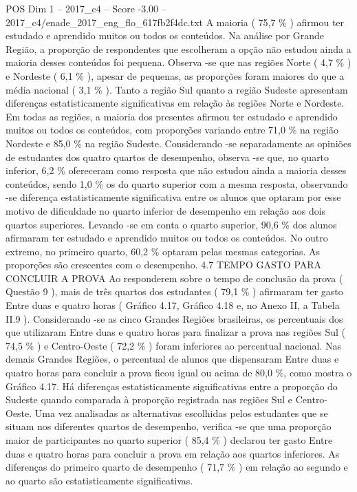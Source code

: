 \begin{textsample}{POS Dim 1 – 2017\_c4 – Score -3.00 – 2017\_c4/enade\_2017\_eng\_flo\_617fb2f4dc.txt}
A maioria ( 75,7 \% ) afirmou ter estudado e aprendido muitos ou todos os conteúdos.
Na análise por Grande Região, a proporção de respondentes que escolheram a opção não estudou ainda a maioria desses conteúdos foi pequena.
Observa -se que nas regiões Norte ( 4,7 \% ) e Nordeste ( 6,1 \% ), apesar de pequenas, as proporções foram maiores do que a média nacional ( 3,1 \% ).
Tanto a região Sul quanto a região Sudeste apresentam diferenças estatisticamente significativas em relação às regiões Norte e Nordeste.
Em todas as regiões, a maioria dos presentes afirmou ter estudado e aprendido muitos ou todos os conteúdos, com proporções variando entre 71,0 \% na região Nordeste e 85,0 \% na região Sudeste.
Considerando -se separadamente as opiniões de estudantes dos quatro quartos de desempenho, observa -se que, no quarto inferior, 6,2 \% ofereceram como resposta que não estudou ainda a maioria desses conteúdos, sendo 1,0 \% os do quarto superior com a mesma resposta, observando -se diferença estatisticamente significativa entre os alunos que optaram por esse motivo de dificuldade no quarto inferior de desempenho em relação aos dois quartos superiores.
Levando -se em conta o quarto superior, 90,6 \% dos alunos afirmaram ter estudado e aprendido muitos ou todos os conteúdos.
No outro extremo, no primeiro quarto, 60,2 \% optaram pelas mesmas categorias.
As proporções são crescentes com o desempenho. 4.7 TEMPO GASTO PARA CONCLUIR A PROVA Ao responderem sobre o tempo de conclusão da prova ( Questão 9 ), mais de três quartos dos estudantes ( 79,1 \% ) afirmaram ter gasto Entre duas e quatro horas ( Gráfico 4.17, Gráfico 4.18 e, no Anexo II, a Tabela II.9 ).
Considerando -se as cinco Grandes Regiões brasileiras, os percentuais dos que utilizaram Entre duas e quatro horas para finalizar a prova nas regiões Sul ( 74,5 \% ) e Centro-Oeste ( 72,2 \% ) foram inferiores ao percentual nacional.
Nas demais Grandes Regiões, o percentual de alunos que dispensaram Entre duas e quatro horas para concluir a prova ficou igual ou acima de 80,0 \%, como mostra o Gráfico 4.17.
Há diferenças estatisticamente significativas entre a proporção do Sudeste quando comparada à proporção registrada nas regiões Sul e Centro-Oeste.
Uma vez analisadas as alternativas escolhidas pelos estudantes que se situam nos diferentes quartos de desempenho, verifica -se que uma proporção maior de participantes no quarto superior ( 85,4 \% ) declarou ter gasto Entre duas e quatro horas para concluir a prova em relação aos quartos inferiores.
As diferenças do primeiro quarto de desempenho ( 71,7 \% ) em relação ao segundo e ao quarto são estatisticamente significativas.

\end{textsample}
